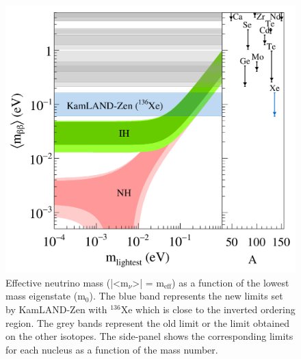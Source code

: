 \documentclass[main.tex]{subfiles}
\begin{document}
\begin{figure}[h!]
\begin{center}
\includegraphics[scale=0.60]{pictures/Chap2/KamLaNDZenResults.pdf}
\caption{Effective neutrino mass (|<m$_{\nu}$>| = m$_{\text{eff}}$) as a function of the lowest mass eigenstate (m$_\text{0}$). The blue band represents the new limits set by KamLAND-Zen with $^{\text{136}}$Xe which is close to the inverted ordering region. The grey bands represent the old limit or the limit obtained on the other isotopes. The  side-panel shows the corresponding limits for each nucleus as a function of the mass number.}
\label{KamLAND-Zen-results}
\end{center}
\end{figure}

\FloatBarrier
\end{document}
